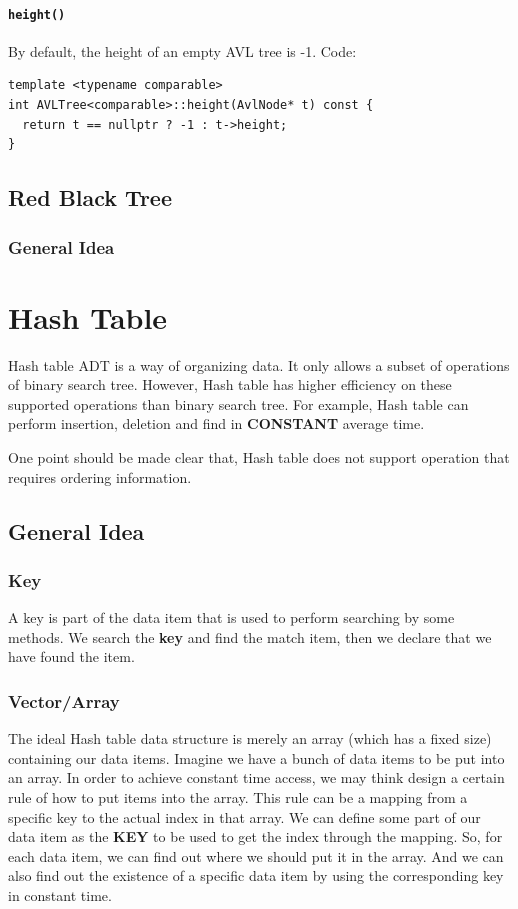 \documentclass[11pt]{book}
\begin{document}
\subsubsection{\texttt{height()}}
\label{sec:org206fd90}
By default, the height of an empty AVL tree is -1. Code:
\begin{verbatim}
template <typename comparable>
int AVLTree<comparable>::height(AvlNode* t) const {
  return t == nullptr ? -1 : t->height;
}
\end{verbatim}

\section{Red Black Tree}
\label{sec:orgce3dfc5}
\subsection{General Idea}
\label{sec:org9f753fa}
\chapter{Hash Table}
\label{sec:org454023a}
Hash table ADT is a way of organizing data. It only allows a subset of operations of binary search tree. However, Hash table has higher efficiency on these supported operations than binary search tree. For example, Hash table can perform insertion, deletion and find in \textbf{CONSTANT} average time.

One point should be made clear that, Hash table does not support operation that requires ordering information.
\section{General Idea}
\label{sec:orgcc49382}
\subsection{Key}
\label{sec:org6d235ef}

A key is part of the data item that is used to perform searching by some methods. We search the \textbf{key} and find the match item, then we declare that we have found the item.
\subsection{Vector/Array}
\label{sec:org17c009f}

The ideal Hash table data structure is merely an array (which has a fixed size) containing our data items. Imagine we have a bunch of data items to be put into an array. In order to achieve constant time access, we may think design a certain rule of how to put items into the array. This rule can be a mapping from a specific key to the actual index in that array. We can define some part of our data item as the \textbf{KEY} to be used to get the index through the mapping. So, for each data item, we can find out where we should put it in the array. And we can also find out the existence of a specific data item by using the corresponding key in constant time.
\end{document}
